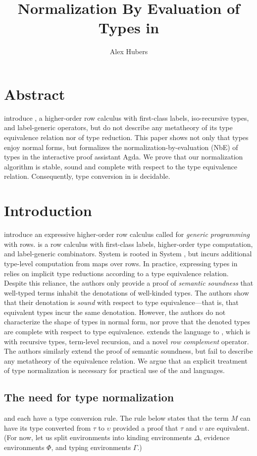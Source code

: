 \documentclass[sigplan,10pt,anonymous,review]{acmart}\settopmatter{printfolios=true,printccs=false,printacmref=false}
\title{Normalization By Evaluation of Types in \Rome}
\author{Alex Hubers}
\affiliation{
  \department{Department of Computer Science}
  \institution{The University of Iowa}
  \streetaddress{14 MacLean Hall}
  \city{Iowa City}
  \state{Iowa}
  \country{USA}}
\begin{document}
\InlineOn{}

\maketitle

\section*{Abstract}
\citet{HubersIMM24} introduce \Rome, a higher-order row calculus with first-class labels, iso-recursive types, and label-generic operators, but do not describe any metatheory of its type equivalence relation nor of type reduction. This paper shows not only that \Rome types enjoy normal forms, but formalizes the normaliz\-ation\--by\--evaluation (NbE) of types in the interactive proof assistant Agda. We prove that our normalization algorithm is stable, sound and complete with respect to the type equivalence relation. Consequently, type conversion in \Rome is decidable.

\section{Introduction}
\citet{HubersM23} introduce an expressive higher-order row calculus called \RO for \emph{generic programming} with rows. \RO is a row calculus with first-class labels, higher-order type computation, and label-generic combinators. System \RO is rooted in System \FO, but incurs additional type-level computation from maps over rows. In practice, expressing types in \RO relies on implicit type reductions according to a type equivalence relation. Despite this reliance, the authors only provide a proof of \emph{semantic soundness} that well-typed terms inhabit the denotations of well-kinded types. The authors show that their denotation is \emph{sound} with respect to type equivalence---that is, that equivalent types incur the same denotation. However, the authors do not characterize the shape of types in normal form, nor prove that the denoted types are complete with respect to type equivalence. \citet{HubersIMM24} extends the \RO language to \Rome, which is \RO with recursive types, term-level recursion, and a novel \emph{row complement} operator. The authors similarly extend the proof of semantic soundness, but fail to describe any metatheory of the equivalence relation. We argue that an explicit treatment of type normalization is necessary for practical use of the \RO and \Rome languages.

\subsection{The need for type normalization}
\label{sec:need-for-type-normalization}
\RO and \Rome each have a type conversion rule. The rule below states that the term $M$ can have its type converted from $\tau$ to $\upsilon$ provided a proof that $\tau$ and $\upsilon$ are equivalent. (For now, let us split environments into kinding environments $\Delta$, evidence environments $\Phi$, and typing environments $\Gamma$.)
\end{document}
